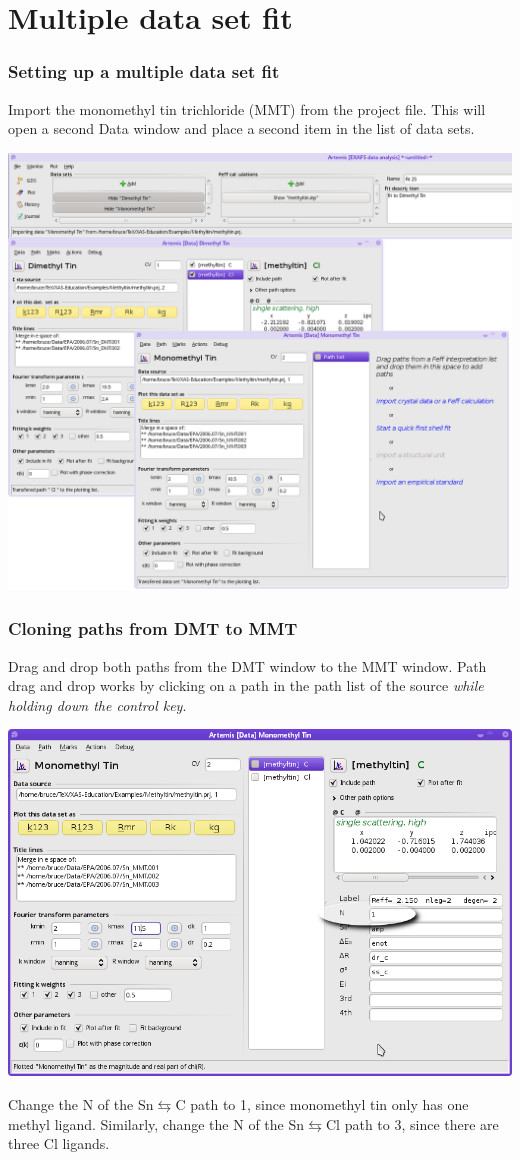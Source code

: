 \documentclass[10pt, xcolor=x11names, compress, handout]{beamer}
\begin{document}
\section{Multiple data set fit}


\begin{frame}
  \frametitle{Setting up a multiple data set fit}
  Import the monomethyl tin trichloride (MMT) from the {\athena}
  project file.  This will open a second Data window and place a
  second item in the list of data sets.
  \begin{center}
    \includegraphics[width=0.7\linewidth]{images/mds.png}
  \end{center}
\end{frame}

\begin{frame}
  \frametitle{Cloning paths from DMT to MMT}
  \small
  Drag and drop both paths from the DMT window to the MMT window.
  Path drag and drop works by clicking on a path in the path list of
  the source \textit{while holding down the control key}.

  \begin{center}
    \includegraphics[width=0.65\linewidth]{images/MMT.png}
  \end{center}
  
  Change the N of the Sn$\leftrightarrows$C path to 1, since
  monomethyl tin only has one methyl ligand.  Similarly, change the N
  of the Sn$\leftrightarrows$Cl path to 3, since there are three Cl ligands.
\end{frame}
\end{document}
